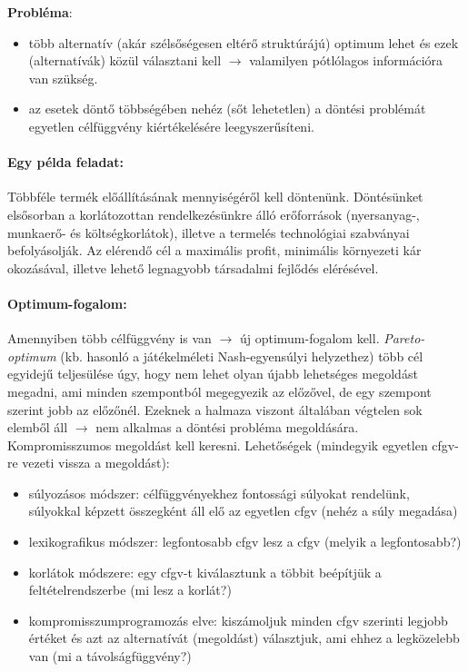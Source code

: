 \documentclass[a4paper,12pt]{article}
\begin{document}
\textbf{Probléma}:
\begin{itemize}
\item több alternatív (akár szélsőségesen eltérő struktúrájú) optimum lehet és ezek (alternatívák) közül választani kell $\rightarrow$ valamilyen pótlólagos információra van szükség.
\item az esetek döntő többségében nehéz (sőt lehetetlen) a döntési problémát egyetlen célfüggvény kiértékelésére leegyszerűsíteni.
\end{itemize}
  
\paragraph{ Egy példa feladat: } Többféle termék előállításának mennyiségéről kell döntenünk. Döntésünket elsősorban a korlátozottan rendelkezésünkre álló erőforrások (nyersanyag-, munkaerő- és költségkorlátok), illetve a termelés technológiai szabványai befolyásolják. Az elérendő cél a maximális profit, minimális környezeti kár okozásával, illetve lehető legnagyobb társadalmi fejlődés elérésével.

\paragraph{ Optimum-fogalom: } Amennyiben több célfüggvény is van $\rightarrow$ új optimum-fogalom kell. \emph{Pareto-optimum} (kb. hasonló a játékelméleti Nash-egyensúlyi helyzethez) több cél egyidejű teljesülése úgy, hogy nem lehet olyan újabb lehetséges megoldást megadni, ami minden szempontból megegyezik az előzővel, de egy szempont szerint jobb az előzőnél. Ezeknek a halmaza viszont általában végtelen sok elemből áll  $\rightarrow$ nem alkalmas a döntési probléma megoldására. Kompromisszumos megoldást kell keresni. Lehetőségek (mindegyik egyetlen cfgv-re vezeti vissza a megoldást):

\begin{itemize}
\item súlyozásos módszer: célfüggvényekhez fontossági súlyokat rendelünk, súlyokkal képzett összegként áll elő az egyetlen cfgv (nehéz a súly megadása)  
\item lexikografikus módszer: legfontosabb cfgv lesz a cfgv (melyik a legfontosabb?)
\item korlátok módszere: egy cfgv-t kiválasztunk a többit beépítjük a feltételrendszerbe (mi lesz a korlát?)
\item kompromisszumprogramozás elve: kiszámoljuk minden cfgv szerinti legjobb értéket és azt az alternatívát (megoldást) választjuk, ami ehhez a legközelebb van (mi a távolságfüggvény?)
\end{itemize}
\end{document}
